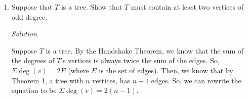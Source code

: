 \documentclass[10pt]{article}
\newenvironment{solution}{\textit{Solution}.}
\newcommand{\proofseparator}{\noindent\makebox[\linewidth]{\rule{\textwidth}{0.4pt}}}
\newcommand{\sol}[1]{
    \vspace{5pt}
    \begin{solution}
    #1
    \end{solution}
    \proofseparator
}
\begin{document}
\begin{enumerate}
\begin{multicols}{2}
              Graph $G$

              \columnbreak

               \\

              Graph $H$

          \end{multicols}

          \sol{
              Let $G = (V,E)$ and $H = (W,F)$ (with $V,W$ being the vertex sets, and $E,F$ being the edge sets). Then, \\

              $G = \{\{1,2,3,4,5\}, \{\{1,2\},\{2,3\},\{3,4\},\{4,5\}\}\}$ and \\
              $F = \{\{1,2,3,4,5\}, \{\{1,2\},\{1,3\},\{1,4\},\{1,5\}\}\}$. \\

              For $G$ to be \textit{isomorphic} to $H$, the process must preserve the degrees of corresponding vertices. Since $G$ has vertices degrees of 1, 2, 2, 2, and 1 for vertices 1-5 and $H$ has vertices 2-5 with $\deg(1)$, and vertex 1 with $\deg(4)$ these graphs are not bijective.
          }

          \newpage

    \item Suppose that $T$ is a tree. Show that $T$ must contain at least two vertices of odd degree.

          \sol{
              Suppose $T$ is a tree. By the Handshake Theorem, we know that the sum of the degrees of $T$'s vertices is always twice the sum of the edges. So, $\Sigma \deg(v) = 2E$ (where $E$ is the set of edges). Then, we know that by Theorem 1, a tree with $n$ vertices, has $n-1$ edges. So, we can rewrite the equation to be $\Sigma \deg(v) = 2(n - 1)$. \\

}
\end{enumerate}
\end{document}
